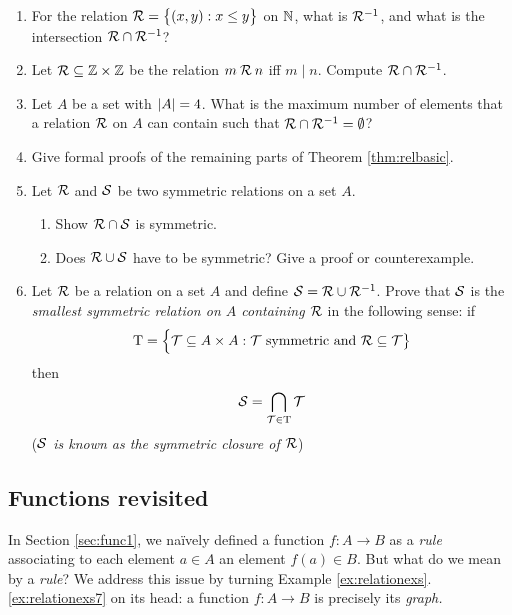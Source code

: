 \begin{exercises}{}{}
\begin{enumerate}
	  
	  \item For the relation $\mathcal{R}=\bigl\{(x,y):x\le y\bigr\}$ on $\mathbb{N}$, what is $\mathcal{R}^{-1}$, and what is the intersection $\mathcal{R}\cap\mathcal{R}^{-1}$?
		
		
		\item Let $\mathcal{R} \subseteq \mathbb{Z}\times\mathbb{Z}$ be the relation $m\mathbin{\mathcal{R}} n$ iff $m\mid n$. Compute $\mathcal{R}\cap\mathcal{R}^{-1}$.
	  
	
	  \item Let $A$ be a set with $\left| A\right|=4$. What is the maximum number of elements that a relation $\mathcal{R}$ on $A$ can contain such that $\mathcal{R}\cap \mathcal{R}^{-1}=\emptyset$?
	   
	  
	  \item Give formal proofs of the remaining parts of Theorem \ref{thm:relbasic}.
	  
	    
	  \item Let $\mathcal{R}$ and $\mathcal{S}$ be two symmetric relations on a set $A$. 
		\begin{enumerate}
	    \item Show $\mathcal{R} \cap \mathcal{S}$ is symmetric.
	    \item Does $\mathcal{R} \cup \mathcal{S}$ have to be symmetric? Give a proof or counterexample.
		\end{enumerate}
	  
	  
	  \item Let $\mathcal{R}$ be a relation on a set $A$ and define $\mathcal{S}=\mathcal{R}\cup\mathcal{R}^{-1}$. Prove that $\mathcal{S}$ is the \emph{smallest symmetric relation on $A$ containing $\mathcal{R}$} in the following sense: if
	  \[
	  	\mathrm T=\Bigl\{\mathcal T\subseteq A\times A:
	  	\mathcal T\text{ symmetric and }\mathcal{R}\subseteq\mathcal T\bigr\}
	  \]
	  then
	  \[
	  	\mathcal{S}=\bigcap\limits_{\mathcal T\in \mathrm T} \mathcal T
	  \]
	  (\emph{$\mathcal{S}$ is known as the \emph{symmetric closure} of $\mathcal{R}$})
	\end{enumerate}

\end{exercises}

\clearpage



\subsection{Functions revisited}\label{sec:func2}

In Section \ref{sec:func1}, we naïvely defined a function $f:A\to B$ as a \emph{rule} associating to each element $a\in A$ an element $f(a)\in B$. But what do we mean by a \emph{rule}? We address this issue by turning Example \ref*{ex:relationexs}.\ref{ex:relationexs7} on its head: a function $f:A\to B$ is precisely its \emph{graph.}

